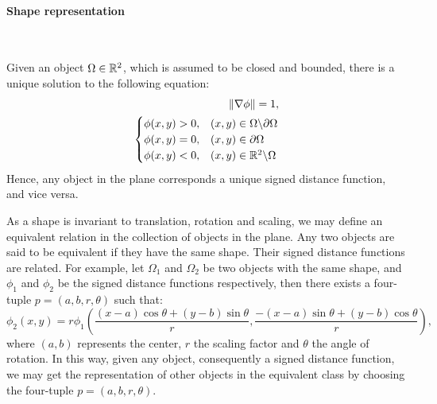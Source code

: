 \paragraph{Shape representation}
~\par \vspace{0.3cm}
Given an object $\Omega \in \mathbb{R}^2$, which is assumed to be closed and bounded, there is a unique solution to the following equation:
\begin{align}
 \label{eq:chan2005-shape}
  \| \nabla \phi \| = 1, \\
  \begin{cases}
     \phi(x,y) > 0, & (x,y) \in \Omega \backslash \partial \Omega \\
     \phi(x,y) = 0, & (x,y) \in \partial \Omega \\
     \phi(x,y) < 0, & (x,y) \in \mathbb{R}^2 \backslash \Omega \\
  \end{cases}
\end{align}
Hence, any object in the plane corresponds a unique signed distance function, and vice versa.

As a shape is invariant to translation, rotation and scaling, we may define an equivalent relation in the collection of objects in the plane. Any two objects are said to be equivalent if they have the same shape. Their signed distance functions are related. For example, let $\Omega_1$ and $\Omega_2$ be two objects with the same shape, and $\phi_1$ and $\phi_2$ be the signed distance functions respectively, then there exists a four-tuple $p = (a, b, r, \theta)$ such that:
\begin{equation}
 \label{eq:chan2005-shape2}
  \phi_2(x,y) = r \phi_1 \left( \frac{(x-a)\cos\theta + (y-b)\sin\theta}{r}, \frac{-(x-a)\sin\theta + (y-b)\cos\theta}{r} \right),
\end{equation}
where $(a, b)$ represents the center, $r$ the scaling factor and $\theta$ the angle of rotation. In this way, given any object,
consequently a signed distance function, we may get the representation of other objects in the equivalent class by
choosing the four-tuple $p = (a, b, r, \theta)$.


